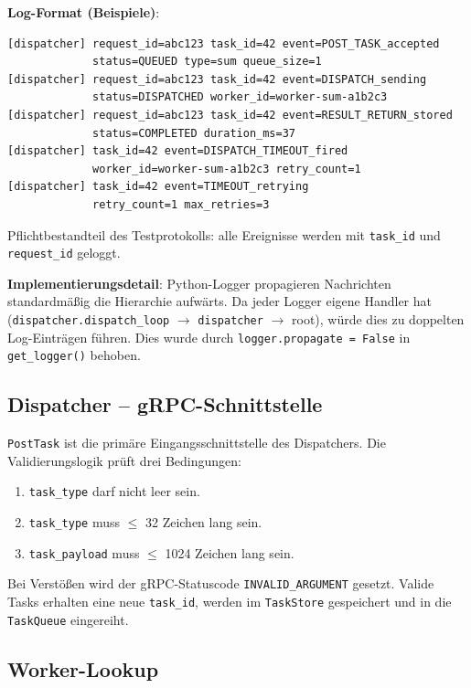 \textbf{Log-Format (Beispiele)}:

\begin{lstlisting}[language={},caption={Strukturierte Log-Ausgaben}]
[dispatcher] request_id=abc123 task_id=42 event=POST_TASK_accepted
             status=QUEUED type=sum queue_size=1
[dispatcher] request_id=abc123 task_id=42 event=DISPATCH_sending
             status=DISPATCHED worker_id=worker-sum-a1b2c3
[dispatcher] request_id=abc123 task_id=42 event=RESULT_RETURN_stored
             status=COMPLETED duration_ms=37
[dispatcher] task_id=42 event=DISPATCH_TIMEOUT_fired
             worker_id=worker-sum-a1b2c3 retry_count=1
[dispatcher] task_id=42 event=TIMEOUT_retrying
             retry_count=1 max_retries=3
\end{lstlisting}
Pflichtbestandteil des Testprotokolls: alle Ereignisse werden
mit \texttt{task\_id} und \texttt{request\_id} geloggt.

\noindent \textbf{Implementierungsdetail}: Python-Logger propagieren Nachrichten
standardmäßig die Hierarchie aufwärts.
Da jeder Logger eigene Handler hat (\texttt{dispatcher.dispatch\_loop}
$\rightarrow$ \texttt{dispatcher} $\rightarrow$ root), würde dies zu
doppelten Log-Einträgen führen.
Dies wurde durch \texttt{logger.propagate = False} in \texttt{get\_logger()} behoben.

\subsection{Dispatcher -- gRPC-Schnittstelle}

\texttt{PostTask} ist die primäre Eingangsschnittstelle des Dispatchers.
Die Validierungslogik prüft drei Bedingungen:

\begin{enumerate}
  \item \texttt{task\_type} darf nicht leer sein.
  \item \texttt{task\_type} muss $\leq$ 32 Zeichen lang sein.
  \item \texttt{task\_payload} muss $\leq$ 1024 Zeichen lang sein.
\end{enumerate}

\noindent Bei Verstößen wird der gRPC-Statuscode \texttt{INVALID\_ARGUMENT} gesetzt.
Valide Tasks erhalten eine neue \texttt{task\_id}, werden im
\texttt{TaskStore} gespeichert und in die \texttt{TaskQueue} eingereiht.

\subsection{Worker-Lookup}

